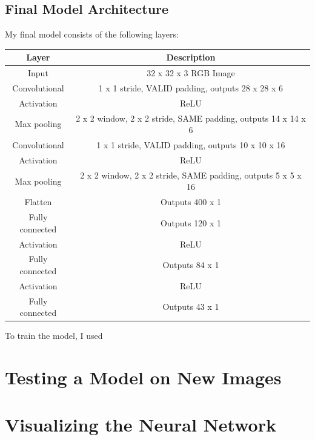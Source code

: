 \documentclass[12pt]{article}
\begin{document}
\subsection{Final Model Architecture}
My final model consists of the following layers:
\begin{center}
\begin{tabular}{|c|c|}
\hline
\textbf{Layer} & \textbf{Description} \\
\hline
Input & 32 x 32 x 3 RGB Image \\
\hline
Convolutional & 1 x 1 stride, VALID padding, outputs 28 x 28 x 6 \\
\hline
Activation & ReLU \\
\hline
Max pooling & 2 x 2 window, 2 x 2 stride, SAME padding, outputs 14 x 14 x 6 \\
\hline
Convolutional & 1 x 1 stride, VALID padding, outputs 10 x 10 x 16 \\
\hline
Activation & ReLU \\
\hline
Max pooling & 2 x 2 window, 2 x 2 stride, SAME padding, outputs 5 x 5 x 16 \\
\hline
Flatten & Outputs 400 x 1 \\
\hline
Fully connected & Outputs 120 x 1\\
\hline
Activation & ReLU \\
\hline
Fully connected & Outputs 84 x 1 \\
\hline
Activation & ReLU \\
\hline
Fully connected & Outputs 43 x 1 \\
\hline
\end{tabular}
\end{center}

To train the model, I used 
\section{Testing a Model on New Images}

\section{Visualizing the Neural Network}



\end{document}
